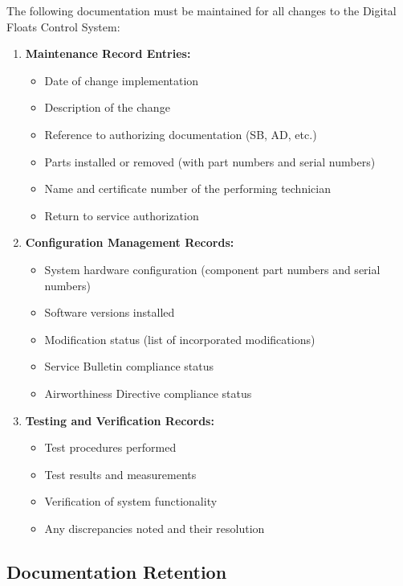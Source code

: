 \documentclass[12pt,a4paper,twoside,openright]{book}
\begin{document}
The following documentation must be maintained for all changes to the Digital Floats Control System:

\begin{enumerate}
    \item \textbf{Maintenance Record Entries:}
    \begin{itemize}
        \item Date of change implementation
        \item Description of the change
        \item Reference to authorizing documentation (SB, AD, etc.)
        \item Parts installed or removed (with part numbers and serial numbers)
        \item Name and certificate number of the performing technician
        \item Return to service authorization
    \end{itemize}
    
    \item \textbf{Configuration Management Records:}
    \begin{itemize}
        \item System hardware configuration (component part numbers and serial numbers)
        \item Software versions installed
        \item Modification status (list of incorporated modifications)
        \item Service Bulletin compliance status
        \item Airworthiness Directive compliance status
    \end{itemize}
    
    \item \textbf{Testing and Verification Records:}
    \begin{itemize}
        \item Test procedures performed
        \item Test results and measurements
        \item Verification of system functionality
        \item Any discrepancies noted and their resolution
    \end{itemize}
\end{enumerate}

\subsection{Documentation Retention}
\end{document}
